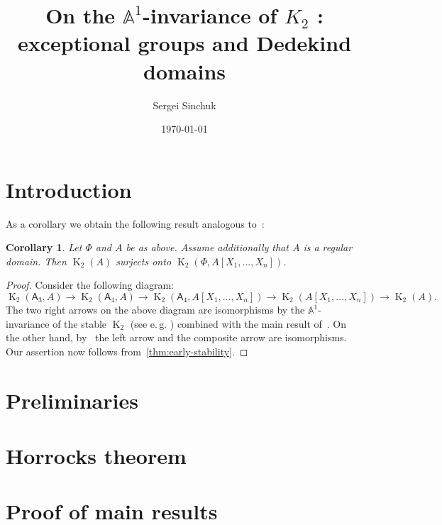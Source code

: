\documentclass[oneside, 10pt]{amsart}
\title{On the $\mathbb{A}^1$-invariance of $K_2$ \RNum{2}: exceptional groups and Dedekind domains}
\author {Sergei Sinchuk}
\date {\today}
\DeclareMathOperator{\K}{K}
\newcommand{\rA}{\mathsf{A}}
\numberwithin{equation}{section}
\numberwithin{lemma}{section}
\newtheorem{cor}[lemma]{Corollary}
\theoremstyle{definition}
\theoremstyle{remark}
\begin{document}
    \maketitle

    \section{Introduction}\label{sec:introduction}

    As a corollary we obtain the following result analogous to~\cite[Theorem~1.1]{St-Ded}:
    \begin{cor}
        \label{cor:dedekind}
        Let $\Phi$ and $A$ be as above.
        Assume additionally that $A$ is a regular domain.
        Then $\K_2(A)$ surjects onto $\K_2(\Phi, A[X_1,\ldots, X_n])$.
    \end{cor}
    \begin{proof}
        Consider the following diagram:
        \[ \K_2(\rA_3, A) \to \K_2(\rA_4, A) \to \K_2(\rA_4, A[X_1, \ldots, X_n]) \rightarrow \K_2(A[X_1, \ldots, X_n]) \to \K_2(A).\]
        The two right arrows on the above diagram are isomorphisms by the $\mathbb{A}^1$-invariance of the stable $\K_2$
        (see e.\,g. \cite[Theorem~V.6.3]{Kbook}) combined with the main result of~\cite{Tu83}.
        On the other hand, by~\cite[Corollary~3.2]{ST76} the left arrow and the composite arrow are isomorphisms.
        Our assertion now follows from~\cref{thm:early-stability}.
    \end{proof}


    \section{Preliminaries}\label{sec:preliminaries}
    

    \section{Horrocks theorem} \label{sec:horrocks}
    

    \section{Proof of main results} \label{sec:main}
    

    \printbibliography
\end{document}
